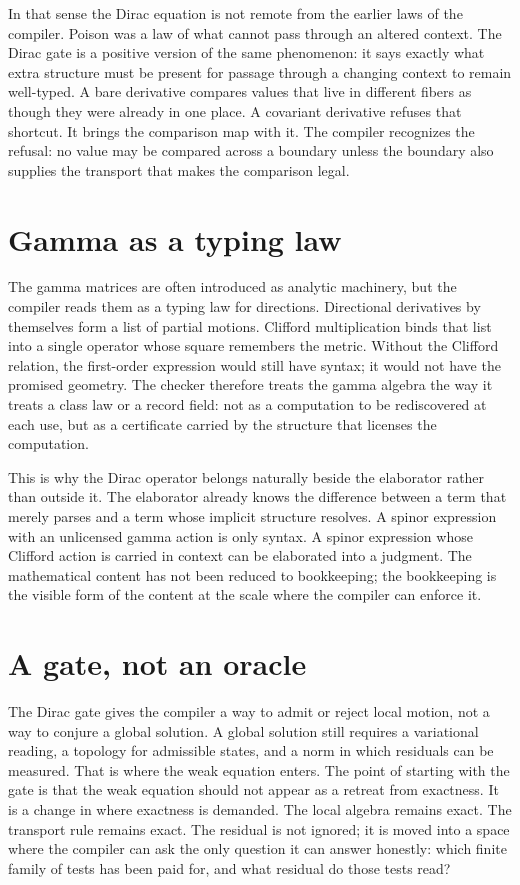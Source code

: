 In that sense the Dirac equation is not remote from the earlier laws of the compiler. Poison was a law of
what cannot pass through an altered context. The Dirac gate is a positive version of the same phenomenon:
it says exactly what extra structure must be present for passage through a changing context to remain
well-typed. A bare derivative compares values that live in different fibers as though they were already in
one place. A covariant derivative refuses that shortcut. It brings the comparison map with it. The compiler
recognizes the refusal: no value may be compared across a boundary unless the boundary also supplies the
transport that makes the comparison legal.

\section{Gamma as a typing law}
\label{se:gamma-as-typing-law}

The gamma matrices are often introduced as analytic machinery, but the compiler reads them as a typing law
for directions. Directional derivatives by themselves form a list of partial motions. Clifford
multiplication binds that list into a single operator whose square remembers the metric. Without the
Clifford relation, the first-order expression would still have syntax; it would not have the promised
geometry. The checker therefore treats the gamma algebra the way it treats a class law or a record field:
not as a computation to be rediscovered at each use, but as a certificate carried by the structure that
licenses the computation.

This is why the Dirac operator belongs naturally beside the elaborator rather than outside it. The
elaborator already knows the difference between a term that merely parses and a term whose implicit
structure resolves. A spinor expression with an unlicensed gamma action is only syntax. A spinor expression
whose Clifford action is carried in context can be elaborated into a judgment. The mathematical content has
not been reduced to bookkeeping; the bookkeeping is the visible form of the content at the scale where the
compiler can enforce it.

\section{A gate, not an oracle}
\label{se:dirac-gate-not-oracle}

The Dirac gate gives the compiler a way to admit or reject local motion, not a way to conjure a global
solution. A global solution still requires a variational reading, a topology for admissible states, and a
norm in which residuals can be measured. That is where the weak equation enters. The point of starting with
the gate is that the weak equation should not appear as a retreat from exactness. It is a change in where
exactness is demanded. The local algebra remains exact. The transport rule remains exact. The residual is
not ignored; it is moved into a space where the compiler can ask the only question it can answer honestly:
which finite family of tests has been paid for, and what residual do those tests read?

